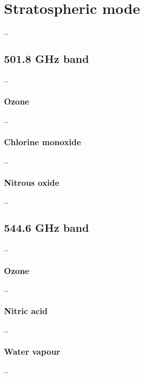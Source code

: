 \chapter{Stratospheric mode}
\label{app:stratmode}
%
\dots

\section{501.8 GHz band}
\label{app:strat:501}
%
\dots



\subsection{Ozone}
%
\dots



\subsection{Chlorine monoxide}
%
\dots


\subsection{Nitrous oxide}
%
\dots


\section{544.6 GHz band}
\label{app:strat:544}
%
\dots




\subsection{Ozone}
%
\dots





\subsection{Nitric acid}
%
\dots





\subsection{Water vapour}
%
\dots





